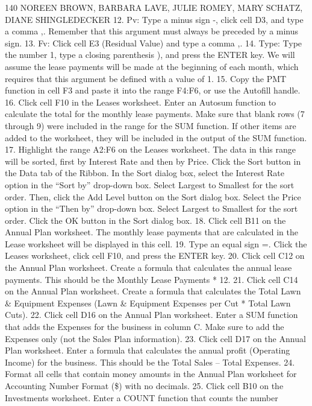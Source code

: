 140 NOREEN BROWN, BARBARA LAVE, JULIE ROMEY, MARY SCHATZ, DIANE SHINGLEDECKER
12. Pv: Type a minus sign -, click cell D3, and type a comma ,. Remember that this argument must
always be preceded by a minus sign.
13. Fv: Click cell E3 (Residual Value) and type a comma ,.
14. Type: Type the number 1, type a closing parenthesis ), and press the ENTER key. We will assume
the lease payments will be made at the beginning of each month, which requires that this
argument be defined with a value of 1.
15. Copy the PMT function in cell F3 and paste it into the range F4:F6, or use the Autofill handle.
16. Click cell F10 in the Leases worksheet. Enter an Autosum function to calculate the total for the
monthly lease payments. Make sure that blank rows (7 through 9) were included in the range for
the SUM function. If other items are added to the worksheet, they will be included in the output
of the SUM function.
17. Highlight the range A2:F6 on the Leases worksheet. The data in this range will be sorted, first by
Interest Rate and then by Price. Click the Sort button in the Data tab of the Ribbon. In the Sort
dialog box, select the Interest Rate option in the “Sort by” drop-down box. Select Largest to
Smallest for the sort order. Then, click the Add Level button on the Sort dialog box. Select the
Price option in the “Then by” drop-down box. Select Largest to Smallest for the sort order. Click
the OK button in the Sort dialog box.
18. Click cell B11 on the Annual Plan worksheet. The monthly lease payments that are calculated
in the Lease worksheet will be displayed in this cell.
19. Type an equal sign =. Click the Leases worksheet, click cell F10, and press the ENTER key.
20. Click cell C12 on the Annual Plan worksheet. Create a formula that calculates the annual lease
payments. This should be the Monthly Lease Payments * 12.
21. Click cell C14 on the Annual Plan worksheet. Create a formula that calculates the Total Lawn \&
Equipment Expenses (Lawn \& Equipment Expenses per Cut * Total Lawn Cuts).
22. Click cell D16 on the Annual Plan worksheet. Enter a SUM function that adds the Expenses for
the business in column C. Make sure to add the Expenses only (not the Sales Plan information).
23. Click cell D17 on the Annual Plan worksheet. Enter a formula that calculates the annual profit
(Operating Income) for the business. This should be the Total Sales – Total Expenses.
24. Format all cells that contain money amounts in the Annual Plan worksheet for Accounting
Number Format (\$) with no decimals.
25. Click cell B10 on the Investments worksheet. Enter a COUNT function that counts the number

